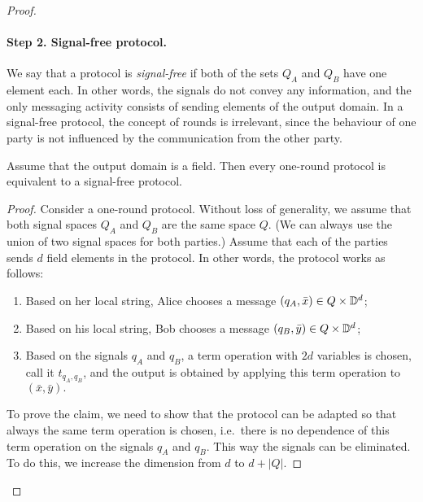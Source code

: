 \begin{proof}
 \paragraph*{Step 2. Signal-free protocol.}  We say that a protocol is \emph{signal-free} if both of the sets $Q_A$ and $Q_B$ have one element each. In other words, the signals do not convey any information, and the only messaging activity consists of sending elements of the output domain. In a signal-free protocol, the concept of rounds is irrelevant, since the behaviour of one party is not influenced by the communication from the other party.
 \begin{claim}
    \label{claim:trivial-messages}
    Assume that the output domain is a field. Then every one-round protocol is equivalent to a signal-free  protocol.
 \end{claim}
 \begin{proof} 
    Consider a one-round protocol. Without loss of generality, we assume that both signal spaces $Q_A$ and $Q_B$ are the same space $Q$. (We can always use the union of two signal spaces for both parties.) Assume that each of the parties sends $d$ field elements in the protocol. In other words, the protocol works as follows:
    \begin{enumerate}
        \item Based on her local string, Alice chooses a message $(q_A,\bar x) \in Q \times \mathbb D^d$;
        \item Based on his local string, Bob chooses a message $(q_B,\bar y) \in Q \times \mathbb D^d$;
        \item Based on the signals $q_A$ and $q_B$, a term operation  with $2d$ variables is chosen, call it $t_{q_A,q_B}$, and the output is obtained by applying this term operation to $(\bar x, \bar y).$
    \end{enumerate}
    To prove the claim, we need to show that the protocol can be adapted so that always the same term operation is chosen, i.e.~there is no dependence of this term operation on the signals $q_A$ and $q_B$. This way the signals can be eliminated. To do this, we increase the dimension from $d$ to $d + |Q|$. 

\end{proof}
\end{proof}
